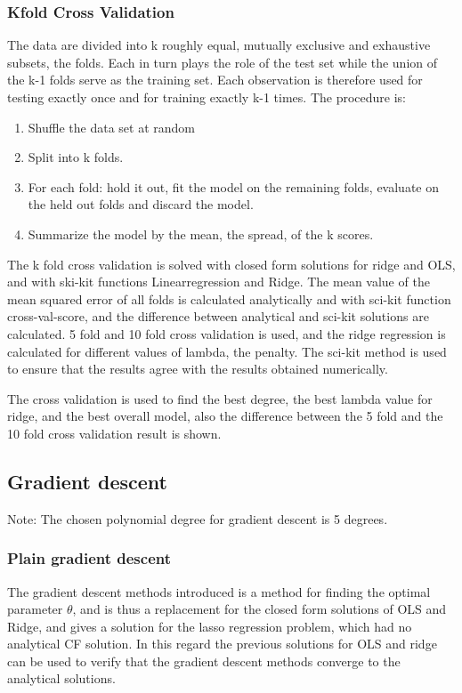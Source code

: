 \documentclass[aps,rmp,reprint,raggedbottom,amsmath,amssymb,longbibliography]{revtex4-1}
\let\label\ReportKernelLabel
\begin{document}
\subsubsection{Kfold Cross Validation}
The data are divided into k roughly equal, mutually exclusive and
exhaustive subsets, the folds. Each in turn plays the role of the
test set while the union of the k-1 folds serve as the training set.
Each observation is therefore used for testing exactly once and for
training exactly k-1 times. The procedure is:
\begin{enumerate}
  \item Shuffle the data set at random
  \item Split into k folds.
  \item For each fold: hold it out, fit the model on the remaining folds,
  evaluate on the held out folds and discard the model.
  \item Summarize the model by the mean, the spread, of the k scores.
\end{enumerate}
\cite[p.~66]{LectureNotes}
The k fold cross validation is solved with closed form solutions
for ridge and OLS, and with ski-kit functions Linearregression and Ridge.
The mean value of the mean squared error of all folds is calculated analytically
and with sci-kit function cross-val-score, and the difference between analytical and
sci-kit solutions are calculated. 5 fold and 10 fold cross validation is used,
and the ridge regression is calculated for different values of lambda, the penalty.
The sci-kit method is used to ensure that the results agree with the results obtained
numerically.

The cross validation is used to find the best degree, the best lambda value for ridge,
and the best overall model, also the difference between the 5 fold and the 10 fold
cross validation result is shown.

\subsection{Gradient descent}
\label{sec:GD}
Note: The chosen polynomial degree for gradient descent is 5 degrees.
\subsubsection{Plain gradient descent}
The gradient descent methods introduced is a method for finding
the optimal parameter $\theta$, and is thus a replacement for
the closed form solutions of OLS and Ridge, and gives a solution
for the lasso regression problem, which had no analytical CF solution.
In this regard the previous solutions for OLS and ridge can be used
to verify that the gradient descent methods converge to the analytical solutions.
\end{document}
